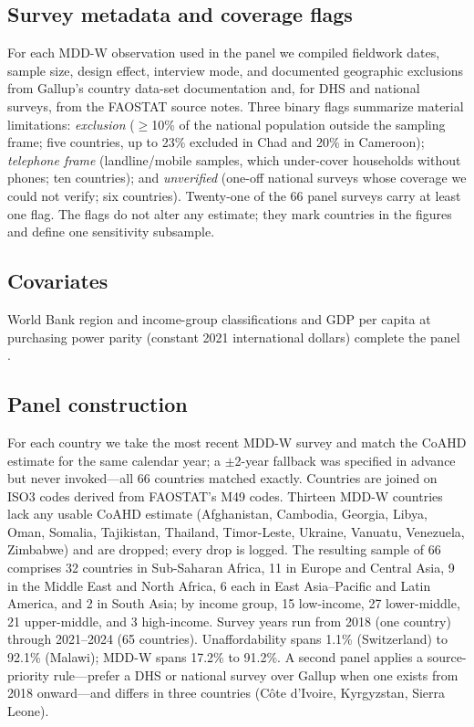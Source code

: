 \documentclass[11pt]{article}
\begin{document}
\subsection{Survey metadata and coverage flags}
For each MDD-W observation used in the panel we compiled fieldwork dates, sample size, design effect, interview mode, and documented geographic exclusions from Gallup's country data-set documentation \citep{gallup2024} and, for DHS and national surveys, from the FAOSTAT source notes. Three binary flags summarize material limitations: \emph{exclusion} ($\geq$10\% of the national population outside the sampling frame; five countries, up to 23\% excluded in Chad and 20\% in Cameroon); \emph{telephone frame} (landline/mobile samples, which under-cover households without phones; ten countries); and \emph{unverified} (one-off national surveys whose coverage we could not verify; six countries). Twenty-one of the 66 panel surveys carry at least one flag. The flags do not alter any estimate; they mark countries in the figures and define one sensitivity subsample.

\subsection{Covariates}
World Bank region and income-group classifications and GDP per capita at purchasing power parity (constant 2021 international dollars) complete the panel \citep{worldbank}.

\subsection{Panel construction}
For each country we take the most recent MDD-W survey and match the CoAHD estimate for the same calendar year; a $\pm$2-year fallback was specified in advance but never invoked---all 66 countries matched exactly. Countries are joined on ISO3 codes derived from FAOSTAT's M49 codes. Thirteen MDD-W countries lack any usable CoAHD estimate (Afghanistan, Cambodia, Georgia, Libya, Oman, Somalia, Tajikistan, Thailand, Timor-Leste, Ukraine, Vanuatu, Venezuela, Zimbabwe) and are dropped; every drop is logged. The resulting sample of 66 comprises 32 countries in Sub-Saharan Africa, 11 in Europe and Central Asia, 9 in the Middle East and North Africa, 6 each in East Asia--Pacific and Latin America, and 2 in South Asia; by income group, 15 low-income, 27 lower-middle, 21 upper-middle, and 3 high-income. Survey years run from 2018 (one country) through 2021--2024 (65 countries). Unaffordability spans 1.1\% (Switzerland) to 92.1\% (Malawi); MDD-W spans 17.2\% to 91.2\%. A second panel applies a source-priority rule---prefer a DHS or national survey over Gallup when one exists from 2018 onward---and differs in three countries (C\^ote d'Ivoire, Kyrgyzstan, Sierra Leone).
\end{document}

